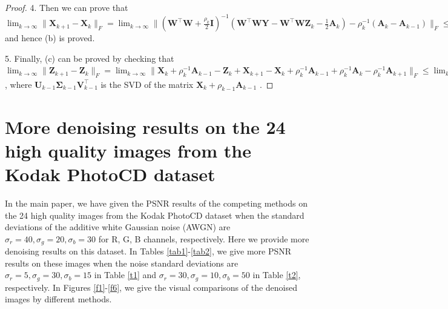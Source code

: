 \documentclass[10pt,onecolumn,letterpaper]{article}
\begin{document}
\begin{proof}
4. Then we can prove that 
$
\lim_{k \to \infty} 
\|
\mathbf{X}_{k+1}
-
\mathbf{X}_{k}
\|_{F}
=
\lim_{k \to \infty} 
\|
(\mathbf{W}^{\top}\mathbf{W}
+
\frac{\rho_{k}}{2}
\mathbf{I})^{-1}
(\mathbf{W}^{\top}\mathbf{W}\mathbf{Y}
-
\mathbf{W}^{\top}\mathbf{W}\mathbf{Z}_{k}
-
\frac{1}{2}
\mathbf{A}_{k})
-
\rho_{k}^{-1}
(\mathbf{A}_{k}-\mathbf{A}_{k-1})
\|_{F}
\le
\lim_{k \to \infty} 
\|
(\mathbf{W}^{\top}\mathbf{W}
+
\frac{\rho_{k}}{2}
\mathbf{I})^{-1}
(\mathbf{W}^{\top}\mathbf{W}\mathbf{Y}
-
\mathbf{W}^{\top}\mathbf{W}\mathbf{Z}_{k}
-
\frac{1}{2}
\mathbf{A}_{k})
\|_{F}
+
\rho_{k}^{-1}\|
\mathbf{A}_{k}-\mathbf{A}_{k-1}
\|_{F}
=
0
$
and hence (b) is proved. 

5. Finally, (c) can be proved by checking that 
$
\lim_{k \to \infty} 
\|
\mathbf{Z}_{k+1}-\mathbf{Z}_{k}
\|_{F}
=
\lim_{k \to \infty} 
\|
\mathbf{X}_{k}+\rho_{k}^{-1}\mathbf{A}_{k-1}-\mathbf{Z}_{k}
+
\mathbf{X}_{k+1}-\mathbf{X}_{k}
+
\rho_{k}^{-1}
\mathbf{A}_{k-1}
+
\rho_{k}^{-1}
\mathbf{A}_{k}
-
\rho_{k}^{-1}
\mathbf{A}_{k+1}
\|_{F}
\le
\lim_{k \to \infty} 
\|
\mathbf{\Sigma}_{k-1}-\mathcal{S}_{\bm{w}/\rho_{k-1}}(\mathbf{\Sigma}_{k-1})
\|_{F}
+
\|
\mathbf{X}_{k+1}-\mathbf{X}_{k}
\|_{F}
+
\rho_{k}^{-1}
\|
\mathbf{A}_{k-1}
+
\mathbf{A}_{k+1}
-
\mathbf{A}_{k}
\|_{F}
=
0
$
,
where $\mathbf{U}_{k-1}\mathbf{\Sigma}_{k-1}\mathbf{V}_{k-1}^{\top}$ is the SVD of the matrix $\mathbf{X}_{k}+\rho_{k-1}\mathbf{A}_{k-1}$
.
\end{proof}




\section{More denoising results on the 24 high quality images from the Kodak PhotoCD dataset}

In the main paper, we have given the PSNR results of the competing methods on the 24 high quality images from the Kodak PhotoCD dataset when the standard deviations  of the additive white Gaussian noise (AWGN) are $\sigma_{r}=40, \sigma_{g}=20, \sigma_{b}=30$ for R, G, B channels, respectively. Here we provide more denoising results on this dataset. In Tables \ref{tab1}-\ref{tab2}, we give more PSNR results on these images when the noise standard deviations are $\sigma_{r}=5, \sigma_{g}=30, \sigma_{b}=15$ in Table \ref{t1} and $\sigma_{r}=30, \sigma_{g}=10, \sigma_{b}=50$ in Table \ref{t2}, respectively. In Figures \ref{f1}-\ref{f6}, we give the visual comparisons of the denoised images by different methods.
\end{document}
